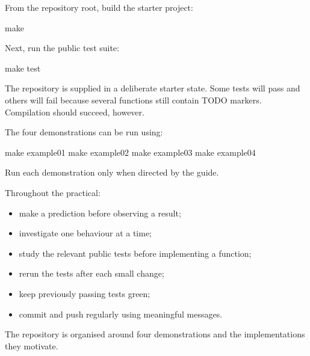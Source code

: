 \documentclass{csc2059practical}
\begin{document}
From the repository root, build the starter project:

\begin{terminal}
make
\end{terminal}

Next, run the public test suite:

\begin{terminal}
make test
\end{terminal}

The repository is supplied in a deliberate starter state. Some tests will pass
and others will fail because several functions still contain TODO markers.
Compilation should succeed, however.

The four demonstrations can be run using:

\begin{terminal}
make example01
make example02
make example03
make example04
\end{terminal}

Run each demonstration only when directed by the guide.

Throughout the practical:

\begin{itemize}
    \item make a prediction before observing a result;
    \item investigate one behaviour at a time;
    \item study the relevant public tests before implementing a function;
    \item rerun the tests after each small change;
    \item keep previously passing tests green;
    \item commit and push regularly using meaningful messages.
\end{itemize}



The repository is organised around four demonstrations and the implementations
they motivate.
\end{document}
